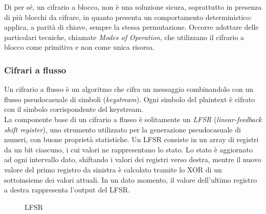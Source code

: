 \documentclass[target=bach,aauheader=,style=]{thud}
\begin{document}
            Di per sé, un cifrario a blocco, non è una soluzione sicura, soprattutto in presenza di più blocchi da cifrare, in quanto presenta un comportamento deterministico: applica, a parità di chiave, sempre la stessa permutazione. Occorre adottare delle particolari tecniche, chiamate \textit{Modes of Operation}, che utilizzano il cifrario a blocco come primitiva e non come unica risorsa. \cite{handcypto, computernet}
            
            \subsubsection{Cifrari a flusso}
            Un cifrario a flusso è un algoritmo che cifra un messaggio combinandolo con un flusso pseudocasuale di simboli (\textit{keystream}). Ogni simbolo del plaintext è cifrato con il simbolo corrispondente del keystream.\\
            La componente base di un cifrario a flusso è solitamente un \textit{LFSR} (\textit{linear-feedback shift register}), uno strumento utilizzato per la generazione pseudocasuale di numeri, con buone proprietà statistiche. Un LFSR consiste in un array di registri da un bit ciascuno, i cui valori ne rappresentano lo stato. Lo stato è aggiornato ad ogni intervallo dato, shiftando i valori dei registri verso destra, mentre il nuovo valore del primo registro da sinistra è calcolato tramite lo XOR di un sottoinsieme dei valori attuali. In un dato momento, il valore dell'ultimo registro a destra rappresenta l'output del LFSR.\cite{moderncrypto}
            \begin{figure}[htbp]
                \centering
                \caption{LFSR}
                \label{fig:placeholder}
            \end{figure}
\end{document}
